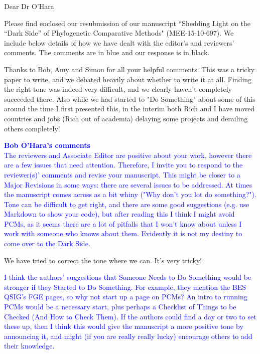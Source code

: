 \documentclass[12pt]{letter}
\begin{document}
\begin{letter}{}
\opening{Dear Dr O'Hara}

Please find enclosed our resubmission of our manuscript ``Shedding Light on the ``Dark Side'' of Phylogenetic Comparative Methods" (MEE-15-10-697). We include below details of how we have dealt with the editor's and reviewers' comments. The comments are in blue and our response is in black.

Thanks to Bob, Amy and Simon for all your helpful comments. This was a tricky paper to write, and we debated heavily about whether to write it at all. Finding the right tone was indeed very difficult, and we clearly haven't completely succeeded there. Also while we had started to "Do Something" about some of this around the time I first presented this, in the interim both Rich and I have moved countries and jobs (Rich out of academia) delaying some projects and derailing others completely!

\textcolor{blue}{\textbf{Bob O'Hara's comments}}\\

\textcolor{blue}{The reviewers and Associate Editor are positive about your work, however there are a few issues that need attention. Therefore, I invite you to respond to the reviewer(s)' comments and revise your manuscript. This might be closer to a Major Revisions in some ways: there are several issues to be addressed. At times the manuscript comes across as a bit whiny ("Why don't you lot do something?"). Tone can be difficult to get right, and there are some good suggestions (e.g. use Markdown to show your code), but after reading this I think I might avoid PCMs, as it seems there are a lot of pitfalls that I won't know about unless I work with someone who knows about them. Evidently it is not my destiny to come over to the Dark Side.}

We have tried to correct the tone where we can. It's very tricky! 

\textcolor{blue}{I think the authors' suggestions that Someone Needs to Do Something would be stronger if they Started to Do Something. For example, they mention the BES QSIG's FGE pages, so why not start up a page on PCMs? An intro to running PCMs would be a necessary start, plus perhaps a Checklist of Things to be Checked (And How to Check Them). If the authors could find a day or two to set these up, then I think this would give the manuscript a more positive tone by announcing it, and might (if you are really really lucky) encourage others to add their knowledge.}


\end{letter}
\end{document}
